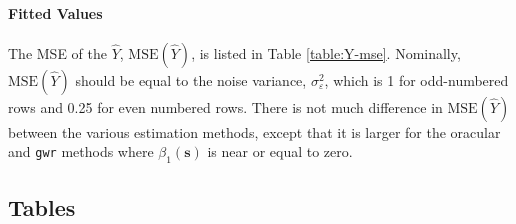 \documentclass[authoryear, review, 11pt]{elsarticle}
\begin{document}
	\paragraph{Fitted Values} The MSE of the $\hat{Y}$, $\text{MSE}\left(\hat{Y}\right)$, is listed in Table \ref{table:Y-mse}. Nominally, $\text{MSE}\left(\hat{Y}\right)$ should be equal to the noise variance, $\sigma_{\varepsilon}^2$, which is 1 for odd-numbered rows and 0.25 for even numbered rows. There is not much difference in $\text{MSE}\left(\hat{Y}\right)$ between the various estimation methods, except that it is larger for the oracular and \verb!gwr! methods where $\beta_1(\bm{s})$ is near or equal to zero.
	
	\subsection{Tables}
\end{document}
